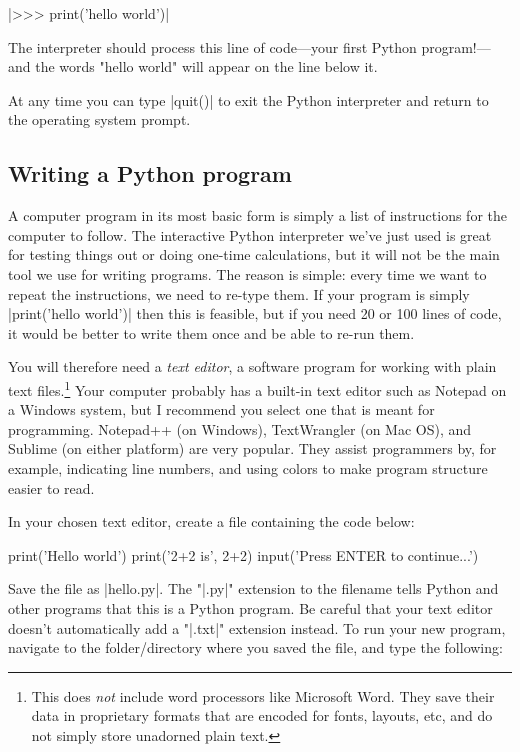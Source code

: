 \documentclass[11pt]{book}
\newcommand{\term}[1]{\emph{#1}} %
\begin{document}
|>>> print('hello world')|

The interpreter should process this line of code---your first Python program!---and the words "hello world" will appear on the line below it.

At any time you can type |quit()| to exit the Python interpreter and return to the operating system prompt.


\subsection*{Writing a Python program}

A computer program in its most basic form is simply a list of instructions for the computer to follow.  The interactive Python interpreter we've just used is great for testing things out or doing one-time calculations, but it will not be the main tool we use for writing programs.  The reason is simple: every time we want to repeat the instructions, we need to re-type them.  If your program is simply \pyinline|print('hello world')| then this is feasible, but if you need 20 or 100 lines of code, it would be better to write them once and be able to re-run them.

You will therefore need a \term{text editor}, a software program for working with plain text files.\footnote{This does \emph{not} include word processors like Microsoft Word. They save their data in proprietary formats that are encoded for fonts, layouts, etc, and do not simply store unadorned plain text.}  Your computer probably has a built-in text editor such as Notepad on a Windows system, but I recommend you select one that is meant for programming.  Notepad++ (on Windows), TextWrangler (on Mac OS), and Sublime (on either platform) are very popular.  They assist programmers by, for example, indicating line numbers, and using colors to make program structure easier to read.

In your chosen text editor, create a file containing the code below:

\begin{pycode}
print('Hello world')
print('2+2 is', 2+2)
input('Press ENTER to continue...')
\end{pycode}

Save the file as |hello.py|.  The "|.py|" extension to the filename tells Python and other programs that this is a Python program.  Be careful that your text editor doesn't automatically add a "|.txt|" extension instead.  To run your new program, navigate to the folder/directory where you saved the file, and type the following:
\end{document}
